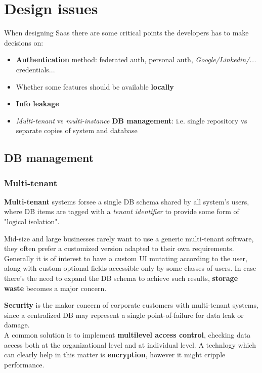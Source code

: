 \section{Design issues}
When designing Saas there are some critical points the developers has to make decisions on:
\begin{itemize}
   \item \textbf{Authentication} method: federated auth, personal auth, \textit{Google/Linkedin/...} credentials... 
   \item Whether some features should be available \textbf{locally}
   \item \textbf{Info leakage}
   \item \textit{Multi-tenant} vs \textit{multi-instance} \textbf{DB management}:
   i.e. single repository vs separate copies of system and database
\end{itemize}

\subsection{DB management}
\subsubsection{Multi-tenant}
\textbf{Multi-tenant} systems forsee a single DB schema shared by all system's users,
where DB items are tagged with a \textit{tenant identifier} to provide some form of "logical isolation".

Mid-size and large businesses rarely want to use a generic multi-tenant software, 
they often prefer a customized version adapted to their own requirements.
Generally it is of interest to have a custom UI mutating according to the user,
along with custom optional fields accessible only by some classes of users.
In case there's the need to expand the DB schema to achieve such results,
\textbf{storage waste} becomes a major concern.


\textbf{Security} is the makor concern of corporate customers with multi-tenant systems,
since a centralized DB may represent a single point-of-failure for data leak or damage.\\
A common solution is to implement \textbf{multilevel access control}, checking data access both at the organizational level and at individual level.
A technlogy which can clearly help in this matter is \textbf{encryption},
however it might cripple performance.

